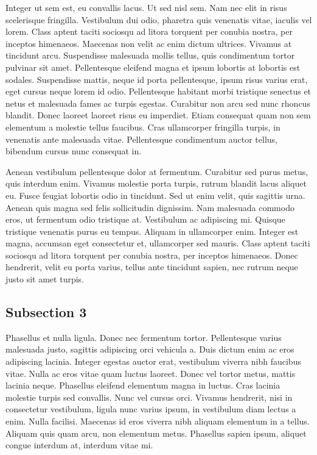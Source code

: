Integer ut sem est, eu convallis lacus. Ut sed nisl sem. Nam nec elit in risus scelerisque fringilla. Vestibulum dui
odio, pharetra quis venenatis vitae, iaculis vel lorem. Class aptent taciti sociosqu ad litora torquent per conubia
nostra, per inceptos himenaeos. Maecenas non velit ac enim dictum ultrices. Vivamus at tincidunt arcu. Suspendisse
malesuada mollis tellus, quis condimentum tortor pulvinar sit amet. Pellentesque eleifend magna et ipsum lobortis at
lobortis est sodales. Suspendisse mattis, neque id porta pellentesque, ipsum risus varius erat, eget cursus neque lorem
id odio. Pellentesque habitant morbi tristique senectus et netus et malesuada fames ac turpis egestas. Curabitur non
arcu sed nunc rhoncus blandit. Donec laoreet laoreet risus eu imperdiet. Etiam consequat quam non sem elementum a
molestie tellus faucibus. Cras ullamcorper fringilla turpis, in venenatis ante malesuada vitae. Pellentesque condimentum
auctor tellus, bibendum cursus nunc consequat in.

Aenean vestibulum pellentesque dolor at fermentum. Curabitur sed purus metus, quis interdum enim. Vivamus molestie porta
turpis, rutrum blandit lacus aliquet eu. Fusce feugiat lobortis odio in tincidunt. Sed ut enim velit, quis sagittis
urna. Aenean quis magna sed felis sollicitudin dignissim. Nam malesuada commodo eros, ut fermentum odio tristique at.
Vestibulum ac adipiscing mi. Quisque tristique venenatis purus eu tempus. Aliquam in ullamcorper enim. Integer est
magna, accumsan eget consectetur et, ullamcorper sed mauris. Class aptent taciti sociosqu ad litora torquent per conubia
nostra, per inceptos himenaeos. Donec hendrerit, velit eu porta varius, tellus ante tincidunt sapien, nec rutrum neque
justo sit amet turpis.

\subsection{Subsection 3}

Phasellus et nulla ligula. Donec nec fermentum tortor. Pellentesque varius malesuada justo, sagittis adipiscing orci
vehicula a. Duis dictum enim ac eros adipiscing lacinia. Integer egestas auctor erat, vestibulum viverra nibh faucibus
vitae. Nulla ac eros vitae quam luctus laoreet. Donec vel tortor metus, mattis lacinia neque. Phasellus eleifend
elementum magna in luctus. Cras lacinia molestie turpis sed convallis. Nunc vel cursus orci. Vivamus hendrerit, nisi in
consectetur vestibulum, ligula nunc varius ipsum, in vestibulum diam lectus a enim. Nulla facilisi. Maecenas id eros
viverra nibh aliquam elementum in a tellus. Aliquam quis quam arcu, non elementum metus. Phasellus sapien ipsum, aliquet
congue interdum at, interdum vitae mi.

